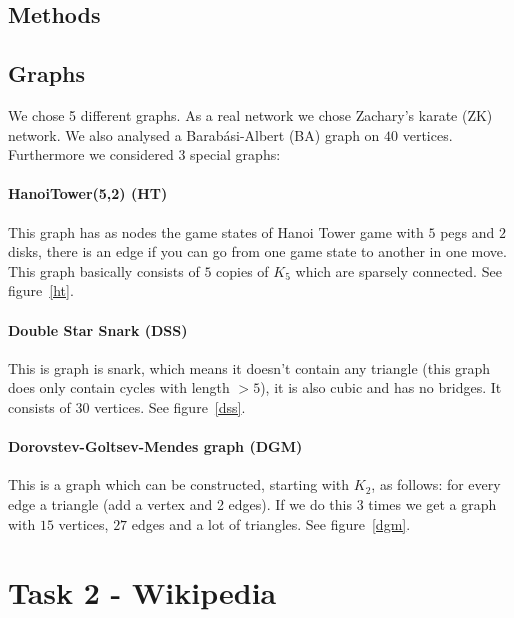 \documentclass[paper=a4, fontsize=11pt]{scrartcl} %
\begin{document}
\subsection{Methods}\label{meth}
\subsection{Graphs}
We chose 5 different graphs. As a real network we chose Zachary's karate (ZK) network. We also analysed a Barab\'{a}si-Albert (BA) graph on $40$ vertices.
Furthermore we considered $3$ special graphs:
\paragraph{HanoiTower(5,2) (HT)}
This graph has as nodes the game states of Hanoi Tower game with $5$ pegs and $2$ disks, there is an edge if you can go from one game state to another in one move. This graph basically consists of $5$ copies of $K_{5}$ which are sparsely connected. See figure~\ref{ht}.
\paragraph{Double Star Snark (DSS)} This is graph is snark, which means it doesn't contain any triangle (this graph does only contain cycles with length $>5$), it is also cubic and has no bridges. It consists of $30$ vertices. See figure~\ref{dss}.
\paragraph{Dorovstev-Goltsev-Mendes graph (DGM)} This is a graph which can be constructed, starting with $K_{2}$, as follows: for every edge a triangle (add a vertex and 2 edges). If we do this $3$ times we get a graph with $15$ vertices, $27$ edges and a lot of triangles. See figure~\ref{dgm}.


\section{Task 2 - Wikipedia}
\end{document}
